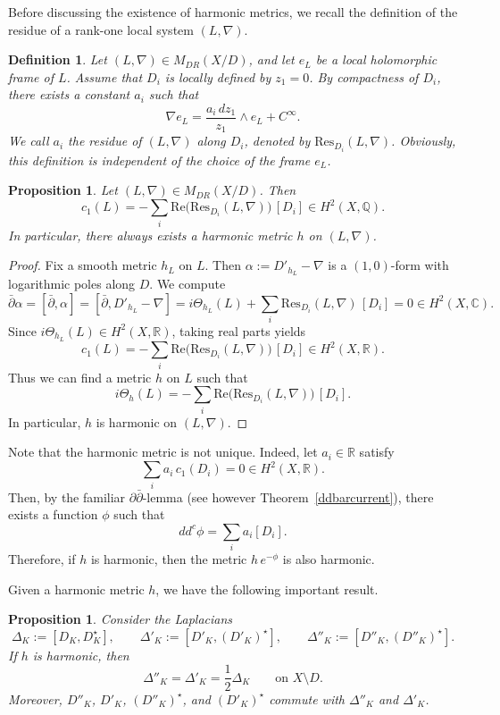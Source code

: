 \documentclass[english]{amsart}
\newcommand{\ddbar}{\partial\bar{\partial}}
\newcommand{\ddc}{dd^c}
\newcommand{\Rel}{\mathrm{Re}}
\newcommand{\Res}{\mathrm{Res}}
\newcommand{\dbar}{\bar \partial}
\newtheorem{proposition}[thm]{Proposition}
\newtheorem{defn}[thm]{Definition}
\numberwithin{equation}{thm}
\begin{document}
\medskip

Before discussing the existence of harmonic metrics, we recall the definition of the residue of a rank-one local system $(L,\nabla)$.

\begin{defn}
	Let $(L,\nabla)\in M_{DR}(X/D)$, and let $e_L$ be a local holomorphic frame of $L$.
	Assume that $D_i$ is locally defined by $z_1=0$. By compactness of $D_i$, there exists a constant $a_i$ such that
	\[
	\nabla e_L = \frac{a_i\,dz_1}{z_1}\wedge e_L + C^\infty.
	\]
	We call $a_i$ the residue of $(L,\nabla)$ along $D_i$, denoted by $\Res_{D_i}(L,\nabla)$.
	Obviously, this definition is independent of the choice of the frame $e_L$.
\end{defn}

\begin{proposition}\label{firstchern}
	Let $(L,\nabla)\in M_{DR}(X/D)$. Then
	\[
	c_1(L) = -\sum_i \Rel\bigl(\Res_{D_i}(L,\nabla)\bigr)\,[D_i]\in H^2(X,\mathbb Q).
	\]
	In particular, there always exists a harmonic metric $h$ on $(L,\nabla)$.
\end{proposition}

\begin{proof}
	Fix a smooth metric $h_L$ on $L$. Then $\alpha:=D'_{h_L}-\nabla$ is a $(1,0)$-form with logarithmic poles along $D$.
	We compute
	\[
	\dbar \alpha
	= [\dbar,\alpha]
	= [\dbar, D'_{h_L}-\nabla]
	= i\Theta_{h_L}(L) + \sum_i \Res_{D_i}(L,\nabla)\,[D_i]
	=0 \in H^2(X,\mathbb C).
	\]
	Since $i\Theta_{h_L}(L)\in H^2(X,\mathbb R)$, taking real parts yields
	\[
	c_1(L) = -\sum_i \Rel\bigl(\Res_{D_i}(L,\nabla)\bigr)\,[D_i]\in H^2(X,\mathbb R).
	\]
	Thus we can find a metric $h$ on $L$ such that
	\[
	i\Theta_h(L) = -\sum_i \Rel\bigl(\Res_{D_i}(L,\nabla)\bigr)\,[D_i].
	\]
	In particular, $h$ is harmonic on $(L,\nabla)$.
\end{proof}

Note that the harmonic metric is not unique. Indeed, let $a_i\in \mathbb R$ satisfy
\[
\sum_i a_i\, c_1(D_i)=0\in H^2(X,\mathbb R).
\]
Then, by the familiar $\ddbar$-lemma (see however Theorem~\ref{ddbarcurrent}), there exists a function $\phi$ such that
\[
\ddc \phi = \sum_i a_i [D_i].
\]
Therefore, if $h$ is harmonic, then the metric $h\,e^{-\phi}$ is also harmonic.

\medskip

Given a harmonic metric $h$, we have the following important result.

\begin{proposition}\cite[Section 1]{Sim92}\label{hodgelap}
	Consider the Laplacians
	\[
	\Delta_K := [D_K, D_K^\star],\qquad
	\Delta'_K := [D'_K,(D'_K)^\star],\qquad
	\Delta''_K := [D''_K,(D''_K)^\star].
	\]
	If $h$ is harmonic, then
	\begin{equation}\label{comparelaplace}
		\Delta''_K = \Delta'_K = \frac{1}{2}\Delta_K
		\qquad \text{on } X\setminus D.
	\end{equation}
	Moreover, $D''_K$, $D'_K$, $(D''_K)^\star$, and $(D'_K)^\star$ commute with $\Delta''_K$ and $\Delta'_K$.
\end{proposition}
\end{document}
